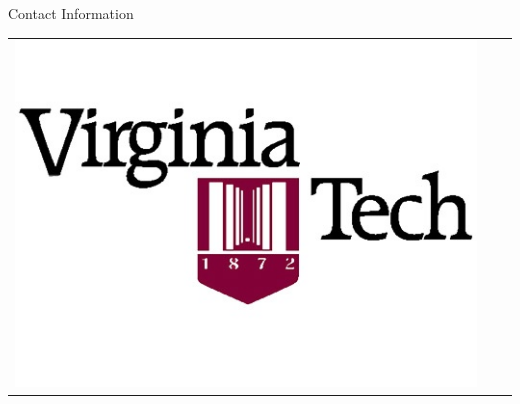 \documentclass[final]{beamer}
\newlength{\onecolwid}
\begin{document}
\begin{frame}[t]
\begin{columns}[t]
\begin{column}{\onecolwid}
\begin{alertblock}{Contact Information}
\end{alertblock}

\begin{center}
\begin{tabular}{ccc}
\includegraphics[width=0.4\linewidth]{Logo} 
\end{tabular}
\end{center}


\end{column} %

\end{columns} %

\end{frame} %
\end{document}
